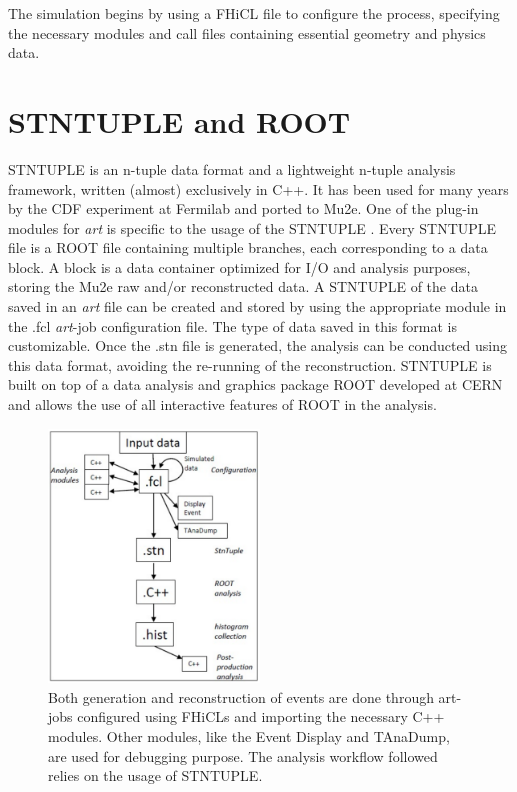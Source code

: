 The simulation begins by using a FHiCL file to configure the process, specifying 
the necessary modules and call files containing essential geometry and physics data.

\section{STNTUPLE and ROOT}
STNTUPLE is an n-tuple data format and a lightweight n-tuple analysis framework, 
written (almost) exclusively in C++. It has been used for many years by the CDF experiment at Fermilab 
and ported to Mu2e. One of the plug-in modules for \textit{art} is specific to the 
usage of the STNTUPLE \cite{stntuple}. Every STNTUPLE file is a ROOT file containing multiple branches, 
each corresponding to a data block. A block is a data container optimized for I/O and 
analysis purposes, storing the Mu2e raw and/or reconstructed data. A STNTUPLE of the 
data saved in an \textit{art} file can be created and stored by using the appropriate 
module in the .fcl \textit{art}-job configuration file. The type of data saved in this 
format is customizable. Once the .stn file is generated, the analysis can be conducted 
using this data format, avoiding the re-running of the reconstruction. STNTUPLE is built 
on top of a data analysis and graphics package ROOT developed at CERN and allows the use 
of all interactive features of ROOT in the analysis.


\begin{figure}[!h]
    \centering
    \includegraphics[width =0.5\textwidth]{figures/png/Screenshot_20240809_174458.png}
    \caption{Both generation and reconstruction of events are done through art-jobs
    configured using FHiCLs and importing the necessary C++ modules. Other modules,
    like the Event Display and TAnaDump, are used for debugging purpose. The analysis
    workflow followed relies on the usage of STNTUPLE.}
    \label{fig:multistage}
\end{figure}

